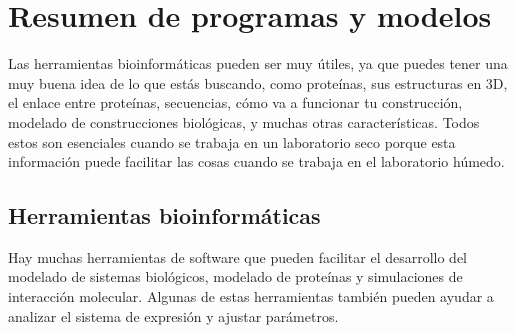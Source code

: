 \documentclass[11pt, letterpaper, spanish]{article}
\begin{document}
{{\newpage

\section{Resumen de programas y modelos}
\par{Las herramientas bioinformáticas pueden ser muy útiles, ya que puedes tener una muy buena idea de lo que estás buscando, como proteínas, sus estructuras en 3D, el enlace entre proteínas, secuencias, cómo va a funcionar tu construcción, modelado de construcciones biológicas, y muchas otras características. Todos estos son esenciales cuando se trabaja en un laboratorio seco porque esta información puede facilitar las cosas cuando se trabaja en el laboratorio húmedo.}

\subsection{Herramientas bioinformáticas}
\par{Hay muchas herramientas de software que pueden facilitar el desarrollo del modelado de sistemas biológicos, modelado de proteínas y simulaciones de interacción molecular. Algunas de estas herramientas también pueden ayudar a analizar el sistema de expresión y ajustar parámetros.}

}}
\end{document}
